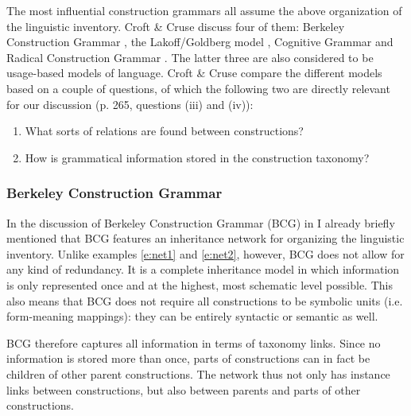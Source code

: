 The most influential construction grammars all assume the above organization of the linguistic inventory. Croft \& Cruse discuss four of them: Berkeley Construction Grammar \citep{kay99grammatical}, the Lakoff/Goldberg model \citep{goldberg95construction}, Cognitive Grammar \citep{langacker87foundations} and Radical Construction Grammar \citep{croft01radical}. The latter three are also considered to be usage-based models of language. Croft \& Cruse compare the different models based on a couple of questions, of which the following two are directly relevant for our discussion (p. 265, questions (iii) and (iv)):

\begin{enumerate}
\item What sorts of relations are found between constructions?
\item How is grammatical information stored in the construction taxonomy?
\end{enumerate}

\subsubsection{Berkeley Construction Grammar}
In the discussion of Berkeley Construction Grammar (BCG) in  I already briefly mentioned that BCG features an inheritance network for organizing the linguistic inventory. Unlike examples \ref{e:net1} and \ref{e:net2}, however, BCG does not allow for any kind of  redundancy. It is a complete inheritance model in which information is only represented once and at the highest, most schematic level possible. This also means that BCG does not require all constructions to be symbolic units (i.e. form-meaning mappings): they can be entirely syntactic or semantic as well.

BCG therefore captures all information in terms of taxonomy links. Since no information is stored more than once, parts of constructions can in fact be children of other parent constructions. The network thus not only has instance links between constructions, but also between parents and parts of other constructions.


